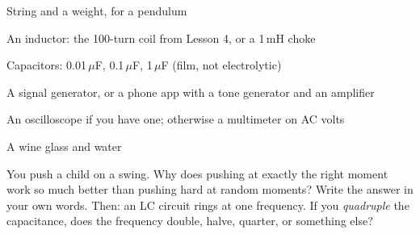 



\begin{materials}
\item String and a weight, for a pendulum
\item An inductor: the 100-turn coil from Lesson 4, or a 1\,mH choke
\item Capacitors: 0.01\,$\mu$F, 0.1\,$\mu$F, 1\,$\mu$F (film, not electrolytic)
\item A signal generator, or a phone app with a tone generator and an amplifier
\item An oscilloscope if you have one; otherwise a multimeter on AC volts
\item A wine glass and water
\end{materials}

\begin{predict}
You push a child on a swing. Why does pushing at exactly the right moment work
so much better than pushing hard at random moments? Write the answer in your own
words. Then: an LC circuit rings at one frequency. If you \emph{quadruple} the
capacitance, does the frequency double, halve, quarter, or something else?
\end{predict}

\begin{center}
\end{center}

